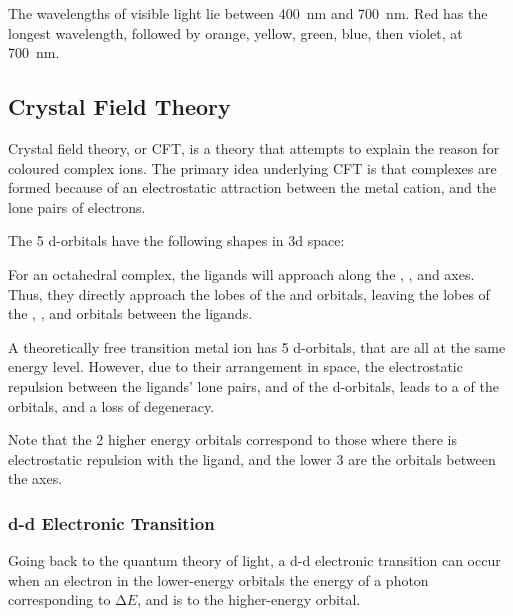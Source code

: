 			The wavelengths of visible light lie between \SI{400}{\nano\metre} and \SI{700}{\nano\metre}. Red has the longest wavelength,
			followed by orange, yellow, green, blue, then violet, at \SI{700}{\nano\metre}.



		\pagebreak
		\subsection{Crystal Field Theory}

			Crystal field theory, or CFT, is a theory that attempts to explain the reason for coloured complex ions. The primary idea
			underlying CFT is that complexes are formed because of an electrostatic attraction between the metal cation, and the lone
			pairs of electrons.

			The 5 d-orbitals have the following shapes in 3d space:


			For an octahedral complex, the ligands will approach along the , , and  axes. Thus, they directly approach
			the lobes of the  and  orbitals, leaving the lobes of the ,
			, and  orbitals between the ligands.

			A theoretically free transition metal ion has 5  d-orbitals, that are all at the same energy level. However, due
			to their arrangement in space, the electrostatic repulsion between the ligands' lone pairs, and  of the d-orbitals,
			leads to a  of the orbitals, and a loss of degeneracy.


			Note that the 2 higher energy orbitals correspond to those where there is electrostatic repulsion with the ligand, and the lower
			3 are the orbitals between the axes.

			\pagebreak
			\subsubsection{d-d Electronic Transition}

				Going back to the quantum theory of light, a d-d electronic transition can occur when an electron in the lower-energy orbitals
				 the energy of a photon corresponding to $∆E$, and is  to the higher-energy orbital.

